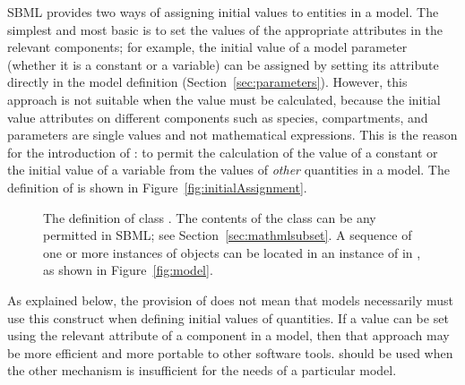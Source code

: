 SBML \thisLV provides two ways of assigning initial values to
entities in a model.  The simplest and most basic is to set the
values of the appropriate attributes in the relevant
components; for example, the initial value of a model parameter
(whether it is a constant or a variable) can be assigned by
setting its  attribute directly in the model definition
(Section~\ref{sec:parameters}).  However, this approach is not
suitable when the value must be calculated, because the initial
value attributes on different components such as species,
compartments, and parameters are single values and not
mathematical expressions.  This is the reason for the introduction
of \InitialAssignment: to permit the calculation of the value of a
constant or the initial value of a variable from the values of
\emph{other} quantities in a model.  The definition of
\InitialAssignment is shown in Figure~\vref{fig:initialAssignment}.

\begin{figure}[htb]
  \centering
  \small
  \vspace*{-1ex}
  \caption{The definition of class \InitialAssignment.  The
    contents of the  class can be any \mathml
    permitted in SBML; see
    Section~\protect\ref{sec:mathmlsubset}.  A
    sequence of one or more instances of \InitialAssignment
    objects can be located in an instance of
    \ListOfInitialAssignments in \Model, as shown in
    Figure~\protect\ref{fig:model}.}
  \label{fig:initialAssignment}
\end{figure}

As explained below, the provision of \InitialAssignment does not
mean that models necessarily must use this construct when defining
initial values of quantities.  If a value can be set
using the relevant attribute of a component in a model, then
that approach may be more efficient and more portable to other
software tools.  \InitialAssignment should be used when the other
mechanism is insufficient for the needs of a particular model.

